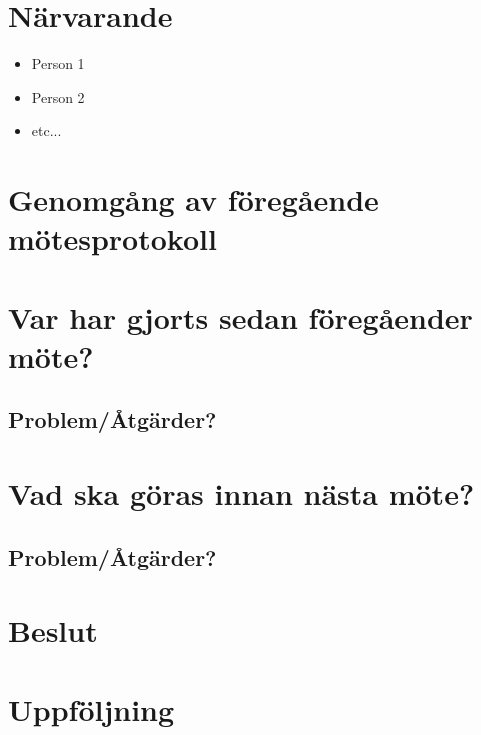 
\section*{Närvarande}
\begin{itemize}
    \itemsep0em
    \item Person 1
    \item Person 2
    \item etc...
\end{itemize}

\section*{Genomgång av föregående mötesprotokoll}


\section*{Var har gjorts sedan föregåender möte?}

\subsection*{Problem/Åtgärder?}


\section*{Vad ska göras innan nästa möte?}

\subsection*{Problem/Åtgärder?}


\section*{Beslut}

\section*{Uppföljning}